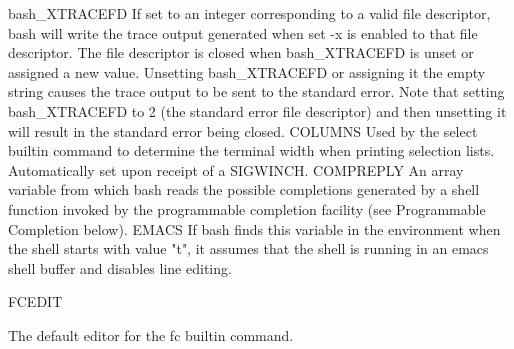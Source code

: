 \documentclass[11pt]{article}
\begin{document}
bash\_XTRACEFD
If set to an integer corresponding to a valid file descriptor, bash will write the trace output generated when set -x is enabled to that file descriptor. The file descriptor is closed when bash\_XTRACEFD is unset or assigned a new value. Unsetting bash\_XTRACEFD or assigning it the empty string causes the trace output to be sent to the standard error. Note that setting bash\_XTRACEFD to 2 (the standard error file descriptor) and then unsetting it will result in the standard error being closed.
COLUMNS
Used by the select builtin command to determine the terminal width when printing selection lists. Automatically set upon receipt of a SIGWINCH.
COMPREPLY
An array variable from which bash reads the possible completions generated by a shell function invoked by the programmable completion facility (see Programmable Completion below).
EMACS
If bash finds this variable in the environment when the shell starts with value "t", it assumes that the shell is running in an emacs shell buffer and disables line editing.

FCEDIT

The default editor for the fc builtin command.
\end{document}
